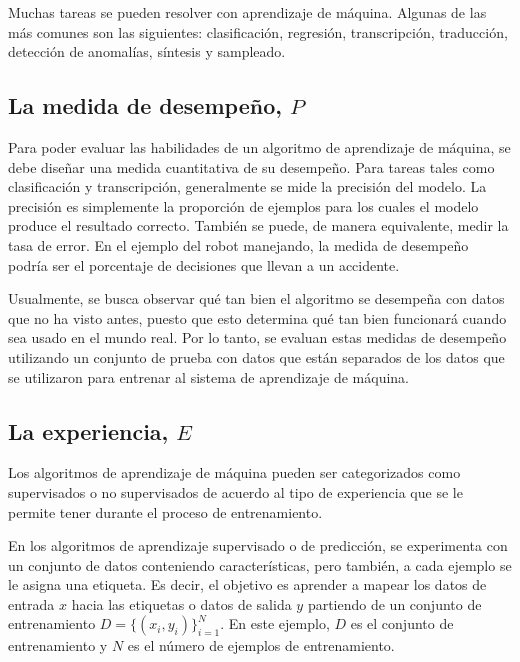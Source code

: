 \vspace{1em}

Muchas tareas se pueden resolver con aprendizaje de máquina. Algunas de las más comunes son las siguientes: clasificación, regresión, transcripción, traducción, detección de anomalías, síntesis y sampleado.
\cite{goodfellow-et-al-2016}

\subsection{La medida de desempeño, $P$}
Para poder evaluar las habilidades de un algoritmo de aprendizaje de máquina, se debe diseñar una medida cuantitativa de su desempeño. Para tareas tales como clasificación y transcripción, generalmente se mide la precisión del modelo. La precisión es simplemente la proporción de ejemplos para los cuales el modelo produce el resultado correcto. También se puede, de manera equivalente, medir la tasa de error. En el ejemplo del robot manejando, la medida de desempeño podría ser el porcentaje de decisiones que llevan a un accidente.

\vspace{1em}

Usualmente, se busca observar qué tan bien el algoritmo se desempeña con datos que no ha visto antes, puesto que esto determina qué tan bien funcionará cuando sea usado en el mundo real. Por lo tanto, se evaluan estas medidas de desempeño utilizando un conjunto de prueba con datos que están separados de los datos que se utilizaron para entrenar al sistema de aprendizaje de máquina. \cite{goodfellow-et-al-2016}

\subsection{La experiencia, $E$}
Los algoritmos de aprendizaje de máquina pueden ser categorizados como supervisados o no supervisados de acuerdo al tipo de experiencia que se le permite tener durante el proceso de entrenamiento.

\vspace{1em}

En los algoritmos de aprendizaje supervisado o de predicción, se experimenta con un conjunto de datos conteniendo características, pero también, a cada ejemplo se le asigna una etiqueta. Es decir, el objetivo es aprender a mapear los datos de entrada $x$ hacia las etiquetas o datos de salida $y$ partiendo de un conjunto de entrenamiento $D = \{(x_i, y_i)\}_{i=1}^N$. En este ejemplo, $D$ es el conjunto de entrenamiento y $N$ es el número de ejemplos de entrenamiento. \cite{Murphy:2012:MLP:2380985}

